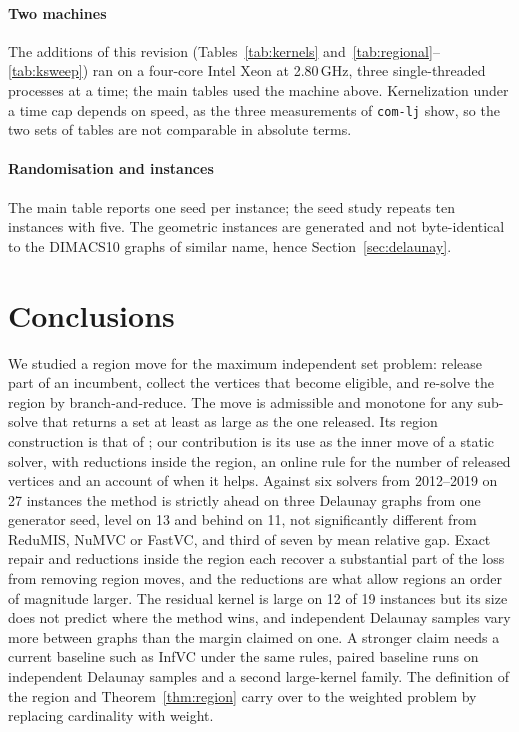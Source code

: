 \documentclass[review,authoryear,11pt]{elsarticle}
\theoremstyle{definition}
\begin{document}
\paragraph{Two machines} The additions of this revision (Tables~\ref{tab:kernels}
and~\ref{tab:regional}--\ref{tab:ksweep}) ran on a four-core Intel Xeon at 2.80\,GHz,
three single-threaded processes at a time; the main tables used the machine above.
Kernelization under a time cap depends on speed, as the three measurements of
\texttt{com-lj} show, so the two sets of tables are not comparable in absolute terms.

\paragraph{Randomisation and instances} The main table reports one seed per instance; the
seed study repeats ten instances with five. The geometric instances are generated and not
byte-identical to the DIMACS10 graphs of similar name, hence Section~\ref{sec:delaunay}.

\section{Conclusions}
\label{sec:conclusions}

We studied a region move for the maximum independent set problem: release part of an
incumbent, collect the vertices that become eligible, and re-solve the region by
branch-and-reduce. The move is admissible and monotone for any sub-solve that returns a
set at least as large as the one released. Its region construction is that of
\citet{borowitz2025}; our contribution is its use as the inner move of a static solver,
with reductions inside the region, an online rule for the number of released vertices and
an account of when it helps. Against six solvers from 2012--2019 on 27 instances the
method is strictly ahead on three Delaunay graphs from one generator seed, level on 13 and
behind on 11, not significantly different from ReduMIS, NuMVC or FastVC, and third of
seven by mean relative gap. Exact repair and reductions inside the region each recover a
substantial part of the loss from removing region moves, and the reductions are what allow
regions an order of magnitude larger. The residual kernel is large on 12 of 19 instances
but its size does not predict where the method wins, and independent Delaunay samples vary
more between graphs than the margin claimed on one. A stronger claim needs a current
baseline such as InfVC under the same rules, paired baseline runs on independent Delaunay
samples and a second large-kernel family. The definition of the region and
Theorem~\ref{thm:region} carry over to the weighted problem by replacing cardinality with
weight.
\end{document}

